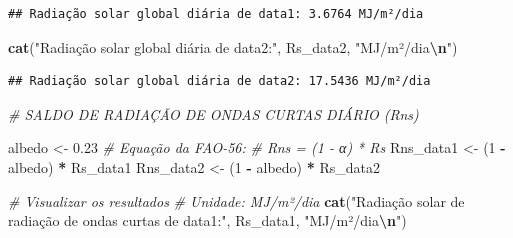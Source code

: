 \documentclass[
]{article}
\newenvironment{Shaded}{\begin{snugshade}}{\end{snugshade}}
\newcommand{\AttributeTok}[1]{\textcolor[rgb]{0.13,0.29,0.53}{#1}}
\newcommand{\CommentTok}[1]{\textcolor[rgb]{0.56,0.35,0.01}{\textit{#1}}}
\newcommand{\ConstantTok}[1]{\textcolor[rgb]{0.56,0.35,0.01}{#1}}
\newcommand{\DecValTok}[1]{\textcolor[rgb]{0.00,0.00,0.81}{#1}}
\newcommand{\FloatTok}[1]{\textcolor[rgb]{0.00,0.00,0.81}{#1}}
\newcommand{\FunctionTok}[1]{\textcolor[rgb]{0.13,0.29,0.53}{\textbf{#1}}}
\newcommand{\NormalTok}[1]{#1}
\newcommand{\OtherTok}[1]{\textcolor[rgb]{0.56,0.35,0.01}{#1}}
\newcommand{\SpecialCharTok}[1]{\textcolor[rgb]{0.81,0.36,0.00}{\textbf{#1}}}
\newcommand{\StringTok}[1]{\textcolor[rgb]{0.31,0.60,0.02}{#1}}
\begin{document}
\begin{Shaded}
\end{Shaded}

\begin{verbatim}
## Radiação solar global diária de data1: 3.6764 MJ/m²/dia
\end{verbatim}

\begin{Shaded}
\begin{Highlighting}[]
\FunctionTok{cat}\NormalTok{(}\StringTok{"Radiação solar global diária de data2:"}\NormalTok{, Rs\_data2, }\StringTok{"MJ/m²/dia}\SpecialCharTok{\textbackslash{}n}\StringTok{"}\NormalTok{)}
\end{Highlighting}
\end{Shaded}

\begin{verbatim}
## Radiação solar global diária de data2: 17.5436 MJ/m²/dia
\end{verbatim}

\begin{Shaded}
\begin{Highlighting}[]
\CommentTok{\# SALDO DE RADIAÇÃO DE ONDAS CURTAS DIÁRIO (Rns)}

\NormalTok{albedo }\OtherTok{\textless{}{-}} \FloatTok{0.23}
\CommentTok{\# Equação da FAO{-}56:}
\CommentTok{\# Rns = (1 {-} α) * Rs}
\NormalTok{Rns\_data1 }\OtherTok{\textless{}{-}}\NormalTok{ (}\DecValTok{1} \SpecialCharTok{{-}}\NormalTok{ albedo) }\SpecialCharTok{*}\NormalTok{ Rs\_data1}
\NormalTok{Rns\_data2 }\OtherTok{\textless{}{-}}\NormalTok{ (}\DecValTok{1} \SpecialCharTok{{-}}\NormalTok{ albedo) }\SpecialCharTok{*}\NormalTok{ Rs\_data2}

\CommentTok{\# Visualizar os resultados}
\CommentTok{\# Unidade: MJ/m²/dia}
\FunctionTok{cat}\NormalTok{(}\StringTok{"Radiação solar de radiação de ondas curtas de data1:"}\NormalTok{, Rs\_data1, }\StringTok{"MJ/m²/dia}\SpecialCharTok{\textbackslash{}n}\StringTok{"}\NormalTok{)}
\end{Highlighting}
\end{Shaded}
\end{document}
